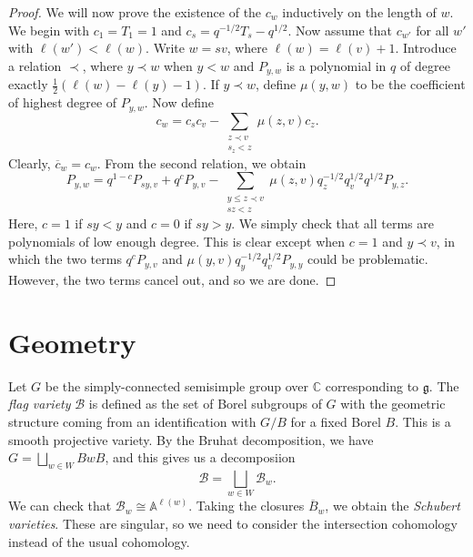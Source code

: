 \documentclass[leqno, openany]{memoir}
\theoremstyle{definition}
\theoremstyle{remark}
\theoremstyle{plain}
\theoremstyle{definition}
\theoremstyle{remark}
\newcommand{\A}{\mathbb{A}}
\newcommand{\C}{\mathbb{C}}
\newcommand{\g}{\mathfrak{g}}
\newcommand{\mc}[1]{\mathcal{#1}}
\newcommand{\ol}[1]{\overline{#1}}
\begin{document}
\begin{proof}
    We will now prove the existence of the $c_w$ inductively on the length of $w$. We begin with $c_1 = T_1 = 1$ and $c_s = q^{-1/2} T_s - q^{1/2}$. Now assume that $c_{w'}$ for all $w'$ with $\ell(w') < \ell(w)$. Write $w = sv$, where $\ell(w) = \ell(v) + 1$. Introduce a relation $\prec$, where $y \prec w$ when $y < w$ and $P_{y,w}$ is a polynomial in $q$ of degree exactly $\frac{1}{2} (\ell(w) - \ell(y) - 1)$. If $y \prec w$, define $\mu(y,w)$ to be the coefficient of highest degree of $P_{y,w}$. Now define
    \[ c_w = c_s c_v - \sum_{\substack{z \prec v \\ s_z < z}} \mu(z,v) c_z. \]
    Clearly, $\ol{c}_w = c_w$. From the second relation, we obtain
    \[ P_{y,w} = q^{1-c} P_{sy,v} + q^c P_{y,v} - \sum_{\substack{y \leq z \prec v \\ sz < z}} \mu(z,v) q_z^{-1/2} q_v^{1/2} q^{1/2} P_{y,z}. \]
    Here, $c = 1$ if $sy < y$ and $c=0$ if $sy > y$. We simply check that all terms are polynomials of low enough degree. This is clear except when $c = 1$ and $y \prec v$, in which the two terms $q^c P_{y,v}$ and $\mu(y,v) q_y^{-1/2} q_v^{1/2} P_{y,y}$ could be problematic. However, the two terms cancel out, and so we are done.
\end{proof}

\section{Geometry}%
\label{sec:geometry}

Let $G$ be the simply-connected semisimple group over $\C$ corresponding to $\g$. The \textit{flag variety} $\mc{B}$ is defined as the set of Borel subgroups of $G$ with the geometric structure coming from an identification with $G/B$ for a fixed Borel $B$. This is a smooth projective variety. By the Bruhat decomposition, we have $G = \bigsqcup_{w \in W} B w B$, and this gives us a decomposiion
\[ \mc{B} = \bigsqcup_{w \in W} \mc{B}_w. \]
We can check that $\mc{B}_w \cong \A^{\ell(w)}$. Taking the closures $\ol{B}_w$, we obtain the \textit{Schubert varieties}. These are singular, so we need to consider the intersection cohomology instead of the usual cohomology.
\end{document}
